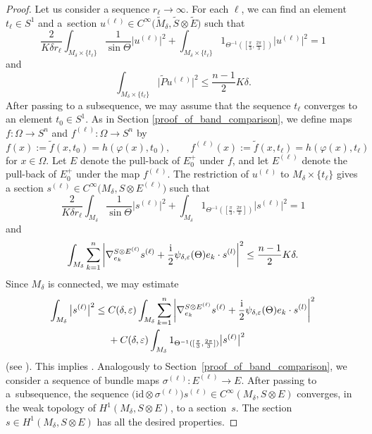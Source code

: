 \documentclass[pdftex]{sigma}
\numberwithin{equation}{section}
\newcommand{\id}{\mathrm{id}}
\begin{document}
\begin{proof}
Let us consider a sequence $r_\ell \to \infty$.
For each $\ell$, we can find an element $t_\ell \in S^1$ and a~section $u^{(\ell)} \in C^\infty\big(\tilde{M}_\delta,\tilde{S} \otimes \tilde{E}\big)$ such that
\[\frac{2}{K\delta r_\ell} \int_{M_\delta \times \{t_\ell\}} \frac{1}{\sin \Theta} \big|u^{(\ell)}\big|^2 + \int_{M_\delta \times \{t_\ell\}} 1_{\Theta^{-1}([\frac{\pi}{3},\frac{2\pi}{3}])} \big|u^{(\ell)}\big|^2 = 1\]
and
\[\int_{M_\delta \times \{t_\ell\}} \big|\tilde{P} u^{(\ell)}\big|^2 \leq \frac{n-1}{2} K\delta.\]
After passing to a subsequence, we may assume that the sequence $t_\ell$ converges to an element $t_0 \in S^1$. As in Section \ref{proof_of_band_comparison}, we define maps $f\colon \Omega \to S^n$ and $f^{(\ell)}\colon \Omega \to S^n$ by
\[
 f(x) := \tilde{f}(x,t_0) = h(\varphi(x),t_0), \qquad f^{(\ell)}(x) := \tilde{f}(x,t_\ell) = h(\varphi(x) ,t_\ell)
\]
for $x \in \Omega$.
Let $E$ denote the pull-back of $E_0^+$ under $f$, and let $E^{(\ell)}$ denote the pull-back of $E_0^+$ under the map $f^{(\ell)}$. The restriction of $u^{(\ell)}$ to $M_\delta \times \{t_\ell\}$ gives a section $s^{(\ell)} \in C^\infty\big(M_\delta,S \otimes E^{(\ell)}\big)$ such that
\[\frac{2}{K\delta r_\ell} \int_{M_\delta} \frac{1}{\sin \Theta} \big|s^{(\ell)}\big|^2 + \int_{M_\delta} 1_{\Theta^{-1}([\frac{\pi}{3},\frac{2\pi}{3}])} \big|s^{(\ell)}\big|^2 = 1\]
and
\[\int_{M_\delta} \sum_{k=1}^n \left| \nabla_{e_k}^{S \otimes E^{(\ell)}} s^{(\ell)} + \frac{\rm i}{2} \psi_{\delta,\varepsilon}(\Theta) e_k \cdot s^{(l)} \right|^2 \leq \frac{n-1}{2} K\delta.\]
Since $M_\delta$ is connected, we may estimate
\begin{align*}
\begin{aligned}
\int_{M_\delta} \big|s^{(\ell)}\big|^2
\leq{}& C(\delta,\varepsilon) \int_{M_\delta} \sum_{k=1}^n \left| \nabla_{e_k}^{S \otimes E^{(\ell)}} s^{(\ell)} + \frac{\rm i}{2} \psi_{\delta,\varepsilon}(\Theta) e_k \cdot s^{(l)} \right|^2 \\
& + C(\delta,\varepsilon) \int_{M_\delta} 1_{\Theta^{-1}([\frac{\pi}{3},\frac{2\pi}{3}])} \big|s^{(\ell)}\big|^2
\end{aligned}
\end{align*}
(see \cite{Baer-Brendle-Chow-Hanke}).
This implies .
Analogously to Section~\ref{proof_of_band_comparison}, we consider a sequence of bundle maps $\sigma^{(\ell)}\colon E^{(\ell)} \to E$. After passing to a~subsequence, the sequence $ \big(\id \otimes \sigma^{(\ell)}\big) s^{(\ell)} \in C^\infty(M_\delta,S \otimes E)$ converges, in the weak topology of $H^1(M_\delta,S \otimes E)$, to a section~$s$. The section $s \in H^1(M_\delta,S \otimes E)$ has all the desired properties.
\end{proof}
\end{document}
